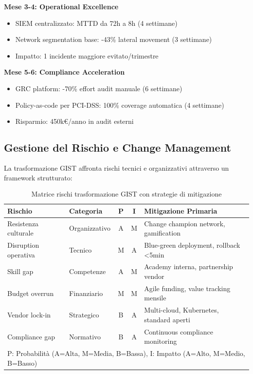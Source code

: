 \textbf{Mese 3-4: Operational Excellence}
\begin{itemize}
\item SIEM centralizzato: MTTD da 72h a 8h (4 settimane)
\item Network segmentation base: -43\% lateral movement (3 settimane)
\item Impatto: 1 incidente maggiore evitato/trimestre
\end{itemize}

\textbf{Mese 5-6: Compliance Acceleration}
\begin{itemize}
\item GRC platform: -70\% effort audit manuale (6 settimane)
\item Policy-as-code per PCI-DSS: 100\% coverage automatica (4 settimane)
\item Risparmio: 450k€/anno in audit esterni
\end{itemize}

\subsection{\texorpdfstring{Gestione del Rischio e Change Management}{5.4.3 - Risk e Change}}
\label{subsec:5.4.3}

La trasformazione GIST affronta rischi tecnici e organizzativi attraverso un framework strutturato:

\begin{table}[htbp]
\centering
\caption{Matrice rischi trasformazione GIST con strategie di mitigazione}
\label{tab:risk_mitigation}
\begin{tabular}{@{}llccl@{}}
\toprule
\textbf{Rischio} & \textbf{Categoria} & \textbf{P} & \textbf{I} & \textbf{Mitigazione Primaria} \\
\midrule
Resistenza culturale & Organizzativo & A & M & Change champion network, gamification \\
Disruption operativa & Tecnico & M & A & Blue-green deployment, rollback <5min \\
Skill gap & Competenze & A & M & Academy interna, partnership vendor \\
Budget overrun & Finanziario & M & M & Agile funding, value tracking mensile \\
Vendor lock-in & Strategico & B & A & Multi-cloud, Kubernetes, standard aperti \\
Compliance gap & Normativo & B & A & Continuous compliance monitoring \\
\bottomrule
\multicolumn{5}{l}{\footnotesize P: Probabilità (A=Alta, M=Media, B=Bassa), I: Impatto (A=Alto, M=Medio, B=Basso)}
\end{tabular}
\end{table}


